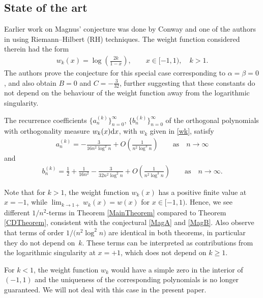 \subsection{State of the art}
Earlier work on Magnus' conjecture was done by Conway and one of the authors in \cite{CD} using Riemann--Hilbert (RH) techniques. The weight function considered therein had the form
\begin{align}\label{wk}
 w_k(x)= \log \left(\frac{2k}{1-x}\right), \qquad x \in [-1,1), \quad k > 1.
\end{align}
The authors prove the conjecture for this special case corresponding to $\alpha = \beta = 0$, and also obtain $B = 0$ and $C = -\frac{3}{32}$, further suggesting that these constants do not depend on the behaviour of the weight function away from the logarithmic singularity.

\begin{Theorem}[{\cite{CD}}]\label{CDTheorem}
 The recurrence coefficients $\big\lbrace a_n^{(k)}\big\rbrace_{n=0}^\infty$, $\big\lbrace b_n^{(k)} \big\rbrace_{n=0}^\infty$ of the orthogonal polynomials with orthogonality measure $w_k(x){\rm d}x$, with $w_k$ given in \eqref{wk}, satisfy
\begin{align*}
 a_n^{(k)} = -\frac{3}{16n^2\log^2 n} + O\left( \frac{1}{n^2\log^3 n}\right) \qquad \text{as} \quad n \to \infty
\end{align*}
and
\begin{align*}
 b_n^{(k)} = \frac{1}{2}+\frac{1}{16n^2}-\frac{3}{32n^2\log^2 n} + O\left(\frac{1}{n^2\log^3 n}\right) \qquad \text{as} \quad n \to \infty.
\end{align*}
\end{Theorem}
Note that for $k > 1$, the weight function $w_k(x)$ has a positive finite value at $x = -1$, while $\lim_{k\to 1+} w_k(x) = w(x)$ for $x \in [-1,1)$. Hence, we see different $1/n^2$-terms in Theorem \ref{MainTheorem} compared to Theorem \ref{CDTheorem}, consistent with the conjectural \eqref{MagA} and \eqref{MagB}. Also observe that terms of order $1/\big(n^2 \log^2 n\big)$ are identical in both theorems, in particular they do not depend on~$k$. These terms can be interpreted as contributions from the logarithmic singularity at $x = +1$, which does not depend on $k \geq 1$.

For $k < 1$, the weight function $w_k$ would have a simple zero in the interior of $(-1,1)$ and the uniqueness of the corresponding polynomials is no longer guaranteed. We will not deal with this case in the present paper.


